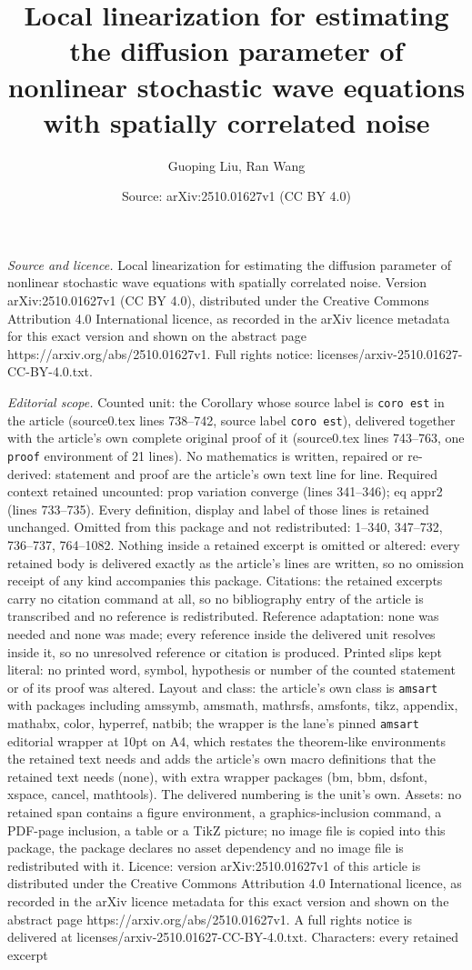 \documentclass[10pt,a4paper]{amsart}
\title[Local linearization for estimating the diffusion parameter o]{Local linearization for estimating the diffusion parameter of nonlinear stochastic wave equations with spatially correlated noise}
\author{Guoping Liu, Ran Wang}
\date{Source: arXiv:2510.01627v1 (CC BY 4.0)}
\begin{document}
\maketitle

\noindent\emph{Source and licence.} Local linearization for estimating the diffusion parameter of nonlinear stochastic wave equations with spatially correlated noise. Version arXiv:2510.01627v1 (CC BY 4.0), distributed under the Creative Commons Attribution 4.0 International licence, as recorded in the arXiv licence metadata for this exact version and shown on the abstract page https://arxiv.org/abs/2510.01627v1. Full rights notice: licenses/arxiv-2510.01627-CC-BY-4.0.txt.\par\smallskip

\noindent\textit{Editorial scope.} Counted unit: the Corollary whose source label is \texttt{coro est} in the article (source0.tex lines 738--742, source label \texttt{coro est}), delivered together with the article's own complete original proof of it (source0.tex lines 743--763, one \texttt{proof} environment of 21 lines). No mathematics is written, repaired or re-derived: statement and proof are the article's own text line for line. Required context retained uncounted: prop variation converge (lines 341--346); eq appr2 (lines 733--735). Every definition, display and label of those lines is retained unchanged. Omitted from this package and not redistributed: 1--340, 347--732, 736--737, 764--1082. Nothing inside a retained excerpt is omitted or altered: every retained body is delivered exactly as the article's lines are written, so no omission receipt of any kind accompanies this package. Citations: the retained excerpts carry no citation command at all, so no bibliography entry of the article is transcribed and no reference is redistributed. Reference adaptation: none was needed and none was made; every reference inside the delivered unit resolves inside it, so no unresolved reference or citation is produced. Printed slips kept literal: no printed word, symbol, hypothesis or number of the counted statement or of its proof was altered. Layout and class: the article's own class is \texttt{amsart} with packages including amssymb, amsmath, mathrsfs, amsfonts, tikz, appendix, mathabx, color, hyperref, natbib; the wrapper is the lane's pinned \texttt{amsart} editorial wrapper at 10pt on A4, which restates the theorem-like environments the retained text needs and adds the article's own macro definitions that the retained text needs (none), with extra wrapper packages (bm, bbm, dsfont, xspace, cancel, mathtools). The delivered numbering is the unit's own. Assets: no retained span contains a figure environment, a graphics-inclusion command, a PDF-page inclusion, a table or a TikZ picture; no image file is copied into this package, the package declares no asset dependency and no image file is redistributed with it. Licence: version arXiv:2510.01627v1 of this article is distributed under the Creative Commons Attribution 4.0 International licence, as recorded in the arXiv licence metadata for this exact version and shown on the abstract page https://arxiv.org/abs/2510.01627v1. A full rights notice is delivered at licenses/arxiv-2510.01627-CC-BY-4.0.txt. Characters: every retained excerpt 
\end{document}
